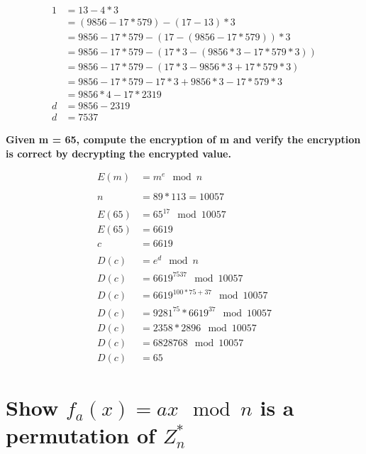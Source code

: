 \documentclass[letterpaper]{article}
\begin{document}
\begin{equation*}
  \begin{split}
1	&= 13 - 4*3 \\
&= (9856 - 17*579) - (17 - 13)*3 \\
&= 9856 - 17*579 - (17 - (9856 - 17*579))*3 \\
&= 9856 - 17*579 - (17*3 - (9856*3 - 17*579*3)) \\
&= 9856 - 17*579 - (17*3 - 9856*3 + 17*579*3) \\
&= 9856 - 17*579 - 17*3 + 9856*3 - 17*579*3 \\
&= 9856*4 - 17*2319 \\
d &= 9856 - 2319 \\
d &= 7537
  \end{split}
\end{equation*}

\textbf{Given m = 65, compute the encryption of m and verify the encryption is correct by decrypting the encrypted value.}

\begin{equation*}
  \begin{split}
E(m) &= m^e \mod n \\
\\
n &= 89 * 113 = 10057 \\
\\
E(65) &= 65^{17}\mod 10057 \\
E(65) &= 6619 \\
c &= 6619 \\
\\
D(c) &= e^d \mod n \\
D(c) &= 6619^{7537}\mod 10057 \\
D(c) &= 6619^{100*75+37}\mod 10057\\
D(c) &= 9281^{75}*6619^{37}\mod 10057\\
D(c) &= 2358*2896\mod 10057\\
D(c) &= 6828768\mod 10057\\
D(c) &= 65
  \end{split}
\end{equation*}


\section{Show $f_a(x)=ax\mod n$ is a permutation of $Z_n^*$}
\end{document}
